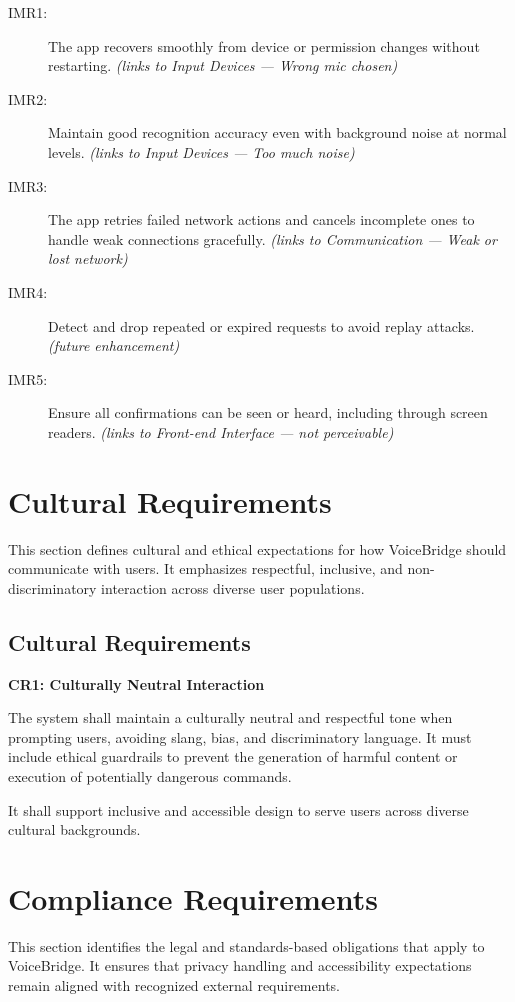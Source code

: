 \documentclass[11pt]{article}
\begin{document}
\begin{description}
  \item[IMR1:] The app recovers smoothly from device or permission changes without restarting. \emph{(links to Input Devices — Wrong mic chosen)}
  \item[IMR2:] Maintain good recognition accuracy even with background noise at normal levels. \emph{(links to Input Devices — Too much noise)}
  \item[IMR3:] The app retries failed network actions and cancels incomplete ones to handle weak connections gracefully. \emph{(links to Communication — Weak or lost network)}
  \item[IMR4:] Detect and drop repeated or expired requests to avoid replay attacks. \emph{(future enhancement)}
  \item[IMR5:] Ensure all confirmations can be seen or heard, including through screen readers. \emph{(links to Front-end Interface — not perceivable)}
\end{description}

\section{Cultural Requirements}
This section defines cultural and ethical expectations for how VoiceBridge should communicate with users. It emphasizes respectful, inclusive, and non-discriminatory interaction across diverse user populations.

\subsection{Cultural Requirements}\label{subsec:cultural}

\textbf{CR1: Culturally Neutral Interaction}\label{req:CR1}

The system shall maintain a culturally neutral and respectful tone when prompting users, avoiding slang, bias, and discriminatory language. It must include ethical guardrails to prevent the generation of harmful content or execution of potentially dangerous commands.

It shall support inclusive and accessible design to serve users across diverse cultural backgrounds.

\section{Compliance Requirements}
This section identifies the legal and standards-based obligations that apply to VoiceBridge. It ensures that privacy handling and accessibility expectations remain aligned with recognized external requirements.
\end{document}
